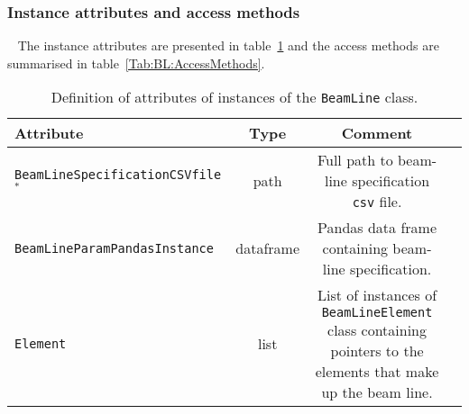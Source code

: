 \subsubsection{Instance attributes and access methods} ~\newline
\label{SubSubSect:BLE:InstAttr}
\noindent
The instance attributes are presented in table~\ref{Tab:BL:Attributes}
and the access methods are summarised in table~\ref{Tab:BL:AccessMethods}.
\begin{table}[h]
  \caption{
    Definition of attributes of instances of
    the \texttt{BeamLine} class.
  }
  \label{Tab:BL:Attributes}
  \begin{center}
    \begin{tabular}{|l|c|c|p{10cm}|}
      \hline
      \textbf{Attribute} & \textbf{Type} & \textbf{Comment}                                                                  \\
      \hline
      \texttt{BeamLineSpecificationCSVfile}$^*$ & path      & Full path to beam-line specification \texttt{csv} file.        \\
      \texttt{BeamLineParamPandasInstance}      & dataframe & Pandas data frame containing beam-line specification.          \\
      \texttt{Element}                          & list      & List of instances of \texttt{BeamLineElement} class containing
                                                              pointers to the elements that make up the beam line.           \\
      \hline
    \end{tabular}
  \end{center}
\end{table}
